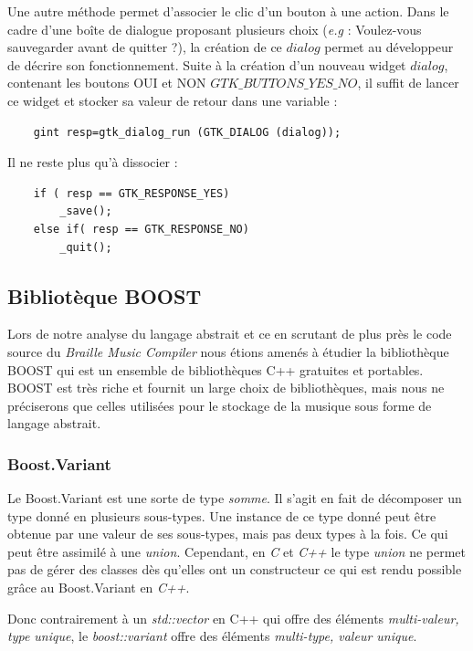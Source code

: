 Une autre méthode permet d'associer le clic d'un bouton à une action.
Dans le cadre d'une boîte de dialogue proposant plusieurs choix (\textit{e.g} : Voulez-vous 
sauvegarder avant de quitter ?), la création de ce $dialog$ permet au développeur de décrire son 
fonctionnement. Suite à la création d'un nouveau widget $dialog$, contenant les boutons OUI et NON 
$GTK\_BUTTONS\_YES\_NO$, il suffit de lancer ce widget et stocker sa valeur de retour dans une variable :
\begin{verbatim}
	gint resp=gtk_dialog_run (GTK_DIALOG (dialog));
\end{verbatim}
Il ne reste plus qu'à dissocier :
\begin{verbatim}
	if ( resp == GTK_RESPONSE_YES)
		_save();
	else if( resp == GTK_RESPONSE_NO)
		_quit();
\end{verbatim}




\subsection{Bibliotèque BOOST}

Lors de notre analyse du langage abstrait et ce en scrutant de plus près le code source du \textit{Braille Music Compiler} nous étions amenés à étudier la bibliothèque BOOST  qui est un ensemble de bibliothèques C++ gratuites et portables. BOOST est très riche et fournit un large choix de bibliothèques, mais nous ne préciserons que celles utilisées pour le stockage de la musique sous forme de langage abstrait.


\subsubsection*{Boost.Variant}

Le Boost.Variant est une sorte de type \textit{somme}. Il s'agit en fait de décomposer un type donné en plusieurs sous-types. Une instance de ce type donné peut être obtenue par une valeur de ses sous-types, mais pas deux types à la fois. Ce qui peut être assimilé à une \textit{union}. Cependant, en \textit{C} et \textit{C++} le type \textit{union} ne permet pas de gérer des classes dès qu'elles ont un constructeur ce qui est rendu possible grâce au Boost.Variant en \textit{C++}.

Donc contrairement à un \textit{std::vector} en C++ qui offre des éléments \textit{multi-valeur, type unique}, le \textit{boost::variant} offre des éléments \textit{multi-type, valeur unique}.


